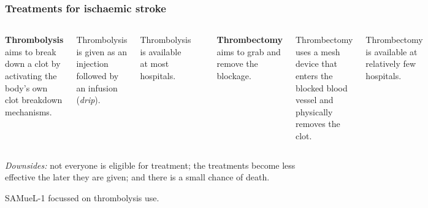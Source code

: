 \documentclass[xcolor={usenames,dvipsnames}]{beamer}
\begin{document}
\begin{frame}
\frametitle{Treatments for ischaemic stroke}

\begin{columns}
    \footnotesize{\textbf{Thrombolysis} aims to break down a clot by activating the body's own clot breakdown mechanisms.}
    
    \vspace{5mm}
    
    \footnotesize{Thrombolysis is given as an injection followed by an infusion (\emph{drip}).}
    
    \vspace{5mm}
    
    \footnotesize{Thrombolysis is available at most hospitals.} 
    
    \begin{center}
    \includegraphics[width=0.6\textwidth]{./images/thrombolysis_mechanism}
    \end{center}
    
    \footnotesize{\textbf{Thrombectomy} aims to grab and remove the blockage.}
    
    \vspace{5mm}
    
    \footnotesize{Thrombectomy uses a mesh device that enters the blocked blood vessel and physically removes the clot.}
    
    \vspace{5mm}
    
    \footnotesize{Thrombectomy is available at relatively few hospitals.} 
    
    \begin{center}
    \includegraphics[width=0.5\textwidth]{./images/thrombectomy_mesh}
    \end{center}

\end{columns}

\vspace{2em}
\footnotesize{\emph{Downsides:} not everyone is eligible for treatment; the treatments become less effective the later they are given; and there is a small chance of death.}

\vspace{1em}
\tiny{SAMueL-1 focussed on thrombolysis use.} 


\end{frame}
\end{document}
